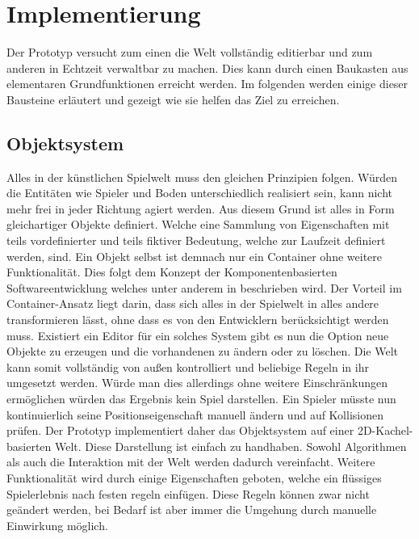 \chapter{Implementierung}
\label{implementation}

Der Prototyp versucht zum einen die Welt vollständig editierbar und zum anderen in Echtzeit verwaltbar zu machen. Dies kann durch einen Baukasten aus elementaren Grundfunktionen erreicht werden. Im folgenden werden einige dieser Bausteine erläutert und gezeigt wie sie helfen das Ziel zu erreichen.

\section{Objektsystem}
\label{sec:Objektsystem}
Alles in der künstlichen Spielwelt muss den gleichen Prinzipien folgen. Würden die Entitäten wie Spieler und Boden unterschiedlich realisiert sein, kann nicht mehr frei in jeder Richtung agiert werden. Aus diesem Grund ist alles in Form gleichartiger Objekte definiert. Welche eine Sammlung von Eigenschaften mit teils vordefinierter und teils fiktiver Bedeutung, welche zur Laufzeit definiert werden, sind. Ein Objekt selbst ist demnach nur ein Container ohne weitere Funktionalität. Dies folgt dem Konzept der Komponentenbasierten Softwareentwicklung welches unter anderem in \cite{CBSE} beschrieben wird.\newline
Der Vorteil im Container-Ansatz liegt darin, dass sich alles in der Spielwelt in alles andere transformieren lässt, ohne dass es von den Entwicklern berücksichtigt werden muss.\newline
Existiert ein Editor für ein solches System gibt es nun die Option neue Objekte zu erzeugen und die vorhandenen zu ändern oder zu löschen. Die Welt kann somit vollständig von außen kontrolliert und beliebige Regeln in ihr umgesetzt werden. Würde man dies allerdings ohne weitere Einschränkungen ermöglichen würden das Ergebnis kein Spiel darstellen. Ein Spieler müsste nun kontinuierlich seine Positionseigenschaft manuell ändern und auf Kollisionen prüfen.\newline
Der Prototyp implementiert daher das Objektsystem auf einer 2D-Kachel-basierten Welt. Diese Darstellung ist einfach zu handhaben. Sowohl Algorithmen als auch die Interaktion mit der Welt werden dadurch vereinfacht. Weitere Funktionalität wird durch einige Eigenschaften geboten, welche ein flüssiges Spielerlebnis nach festen regeln einfügen. Diese Regeln können zwar nicht geändert werden, bei Bedarf ist aber immer die Umgehung durch manuelle Einwirkung möglich.\newline


